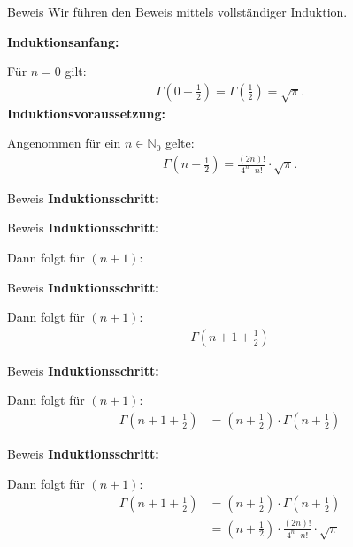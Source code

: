 \documentclass[10pt]{beamer}
\def\bN{\mathbb{N}}
\begin{document}
\begin{frame}{Beweis}
    Wir führen den Beweis mittels vollständiger Induktion.

    \textbf{Induktionsanfang:}
    
    Für \( n = 0 \) gilt:
    \begin{align*}
        \Gamma\left( 0 + \frac{1}{2} \right)
        = \Gamma\left( \frac{1}{2} \right) 
        = \sqrt{\pi}.
    \end{align*}
    \textbf{Induktionsvoraussetzung:}

    Angenommen für ein \( n \in \bN_{0} \) gelte:
    \begin{align*}
        \Gamma\left( n + \frac{1}{2} \right)
        = \frac{\left( 2n \right)!}{4^{n} \cdot n!} \cdot \sqrt{\pi}.
    \end{align*}
\end{frame}



\begin{frame}{Beweis}
    \textbf{Induktionsschritt:}
\end{frame}



\begin{frame}{Beweis}
    \textbf{Induktionsschritt:}

    Dann folgt für \( \left( n + 1 \right) \):
\end{frame}



\begin{frame}{Beweis}
    \textbf{Induktionsschritt:}

    Dann folgt für \( \left( n + 1 \right) \):
    \begin{align*}
        \Gamma\left( n + 1 + \frac{1}{2} \right)
    \end{align*}
\end{frame}



\begin{frame}{Beweis}
    \textbf{Induktionsschritt:}

    Dann folgt für \( \left( n + 1 \right) \):
    \begin{align*}
        \Gamma\left( n + 1 + \frac{1}{2} \right)
        & = \left( n + \frac{1}{2} \right) \cdot \Gamma\left( n + \frac{1}{2} \right)
    \end{align*}
\end{frame}



\begin{frame}{Beweis}
    \textbf{Induktionsschritt:}

    Dann folgt für \( \left( n + 1 \right) \):
    \begin{align*}
        \Gamma\left( n + 1 + \frac{1}{2} \right)
        & = \left( n + \frac{1}{2} \right) \cdot \Gamma\left( n + \frac{1}{2} \right) \\
        & = \left( n + \frac{1}{2} \right) \cdot \frac{\left( 2n \right)!}{4^{n} \cdot n!} \cdot \sqrt{\pi}
    \end{align*}
\end{frame}
\end{document}
